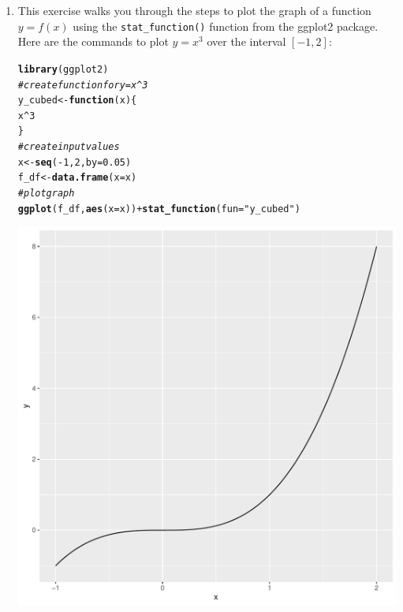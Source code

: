 \documentclass[12pt]{article}\usepackage[]{graphicx}\usepackage[]{color}
\makeatletter
\def\maxwidth{ %
  \ifdim\Gin@nat@width>\linewidth
    \linewidth
  \else
    \Gin@nat@width
  \fi
}
\newcommand{\hlnum}[1]{\textcolor[rgb]{0.686,0.059,0.569}{#1}}%
\newcommand{\hlstr}[1]{\textcolor[rgb]{0.192,0.494,0.8}{#1}}%
\newcommand{\hlcom}[1]{\textcolor[rgb]{0.678,0.584,0.686}{\textit{#1}}}%
\newcommand{\hlopt}[1]{\textcolor[rgb]{0,0,0}{#1}}%
\newcommand{\hlstd}[1]{\textcolor[rgb]{0.345,0.345,0.345}{#1}}%
\newcommand{\hlkwa}[1]{\textcolor[rgb]{0.161,0.373,0.58}{\textbf{#1}}}%
\newcommand{\hlkwb}[1]{\textcolor[rgb]{0.69,0.353,0.396}{#1}}%
\newcommand{\hlkwc}[1]{\textcolor[rgb]{0.333,0.667,0.333}{#1}}%
\newcommand{\hlkwd}[1]{\textcolor[rgb]{0.737,0.353,0.396}{\textbf{#1}}}%
\newenvironment{kframe}{%
 \def\at@end@of@kframe{}%
 \ifinner\ifhmode%
  \def\at@end@of@kframe{\end{minipage}}%
  \begin{minipage}{\columnwidth}%
 \fi\fi%
 \def\FrameCommand##1{\hskip\@totalleftmargin \hskip-\fboxsep
 \colorbox{shadecolor}{##1}\hskip-\fboxsep
     \hskip-\linewidth \hskip-\@totalleftmargin \hskip\columnwidth}%
 \MakeFramed {\advance\hsize-\width
   \@totalleftmargin\z@ \linewidth\hsize
   \@setminipage}}%
 {\par\unskip\endMakeFramed%
 \at@end@of@kframe}
\newenvironment{knitrout}{}{} %
\makeatother
\begin{document}
\begin{enumerate}
    \item This exercise walks you through the steps to plot the graph of a function $y=f(x)$ using the {\tt stat\_function()} function from the ggplot2 package. Here are the commands to plot $y=x^3$ over the interval $[-1,2]$:
\begin{knitrout}
\color{fgcolor}\begin{kframe}
\begin{alltt}
\hlkwd{library}\hlstd{(ggplot2)}
\hlcom{# create function for y=x^3}
\hlstd{y_cubed} \hlkwb{<-} \hlkwa{function}\hlstd{(}\hlkwc{x}\hlstd{)\{}
  \hlstd{x}\hlopt{^}\hlnum{3}
\hlstd{\}}
\hlcom{# create input values}
\hlstd{x} \hlkwb{<-} \hlkwd{seq}\hlstd{(}\hlopt{-}\hlnum{1}\hlstd{,}\hlnum{2}\hlstd{,}\hlkwc{by}\hlstd{=}\hlnum{0.05}\hlstd{)}
\hlstd{f_df} \hlkwb{<-} \hlkwd{data.frame}\hlstd{(}\hlkwc{x}\hlstd{=x)}
\hlcom{# plot graph}
\hlkwd{ggplot}\hlstd{(f_df,}\hlkwd{aes}\hlstd{(}\hlkwc{x}\hlstd{=x))} \hlopt{+} \hlkwd{stat_function}\hlstd{(}\hlkwc{fun}\hlstd{=}\hlstr{"y_cubed"}\hlstd{)}
\end{alltt}
\end{kframe}
\includegraphics[width=\maxwidth]{figure/unnamed-chunk-1-1} 

\end{knitrout}
    

\end{enumerate}
\end{document}

